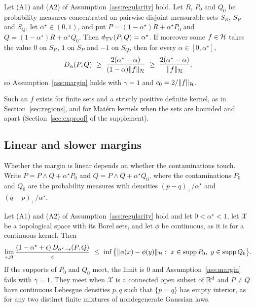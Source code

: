 \begin{example}
\label{ex:separated}
Let (A1) and (A2) of Assumption~\ref{ass:regularity} hold. Let $R$, $P_0$ and $Q_0$ be probability measures
concentrated on pairwise disjoint measurable sets $S_R$, $S_P$ and $S_Q$, let $\alpha^\star\in(0,1)$, and put
$P=(1-\alpha^\star)R+\alpha^\star P_0$ and $Q=(1-\alpha^\star)R+\alpha^\star Q_0$. Then $d_{\mathrm{TV}}(P,Q)=\alpha^\star$. If
moreover some $f\in\mathcal{H}$ takes the value $0$ on $S_R$, $1$ on $S_P$ and $-1$ on $S_Q$, then for every
$\alpha\in[0,\alpha^\star]$,
\[
D_\alpha(P,Q)\ \ge\ \frac{2(\alpha^\star-\alpha)}{(1-\alpha)\|f\|_\Hh}\ \ge\ \frac{2(\alpha^\star-\alpha)}{\|f\|_\Hh},
\]
so Assumption~\ref{ass:margin} holds with $\gamma=1$ and $c_0=2/\|f\|_{\mathcal{H}}$.
\end{example}

Such an $f$ exists for finite sets and a strictly positive definite kernel, as in
Section~\ref{sec:regions}, and for Mat\'ern kernels when the sets are bounded and apart (Section~\ref{sec:exproof} of
the supplement).

\subsection{Linear and slower margins}
\label{sec:linearmargin}

Whether the margin is linear depends on whether the contaminations touch. Write $P=P\wedge Q+\alpha^\star P_0$ and $Q=P\wedge Q+\alpha^\star Q_0$, where the contaminations $P_0$ and $Q_0$ are
the probability measures with densities $(p-q)_+/\alpha^\star$ and $(q-p)_+/\alpha^\star$.

\begin{proposition}
\label{prop:newslope}
Let (A1) and (A2) of Assumption~\ref{ass:regularity} hold and let $0<\alpha^\star<1$, let $\mathcal X$ be a topological
space with its Borel sets, and let $\phi$ be continuous, as it is for a continuous kernel. Then
\[
\lim_{\epsilon\downarrow0}\frac{(1-\alpha^\star+\epsilon)\,D_{\alpha^\star-\epsilon}(P,Q)}{\epsilon}
\ \le\ \inf\big\{\|\phi(x)-\phi(y)\|_{\mathcal{H}}:\ x\in\operatorname{supp} P_0,\ y\in\operatorname{supp} Q_0\big\} .
\]
If the supports of $P_0$ and $Q_0$ meet, the limit is $0$ and Assumption~\ref{ass:margin} fails with $\gamma=1$. They
meet when $\mathcal X$ is a connected open subset of $\mathbb{R}^d$ and $P\neq Q$ have continuous Lebesgue densities $p,q$
such that $\{p=q\}$ has empty interior, as for any two distinct finite mixtures of nondegenerate Gaussian laws.
\end{proposition}

